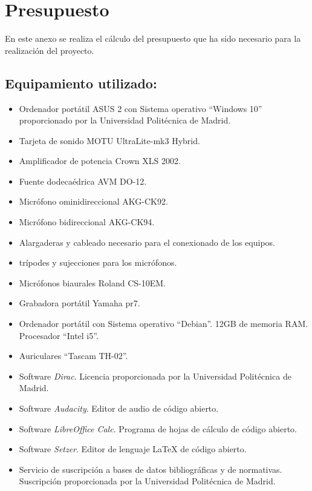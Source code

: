 \documentclass[11pt,a4paper,twoside]{book}
\author{Víctor de Tejada Molera}
\begin{document}
\appendix

\chapter{Presupuesto}
En este anexo se realiza el cálculo del presupuesto que ha sido necesario para la realización del proyecto.

    \section*{Equipamiento utilizado:}

    \begin{itemize}
        \item Ordenador portátil ASUS 2 con Sistema operativo ``Windows 10'' proporcionado por la Universidad Politécnica de Madrid.
	    \item Tarjeta de sonido MOTU UltraLite-mk3 Hybrid.
	    \item Amplificador de potencia Crown XLS 2002.
	    \item Fuente dodecaédrica AVM DO-12.
	    \item Micrófono ominidireccional AKG-CK92.
	    \item Micrófono bidireccional AKG-CK94.
	    \item Alargaderas y cableado necesario para el conexionado de los equipos.
	    \item trípodes y sujecciones para los micrófonos.
	    \item Micrófonos biaurales Roland CS-10EM.
	    \item Grabadora portátil Yamaha pr7.
        \item Ordenador portátil con Sistema operativo ``Debian''. 12GB de memoria RAM. Procesador ``Intel i5''.
	    \item Auriculares ``Tascam TH-02''. 
	    \item Software \textit{Dirac}. Licencia proporcionada por la Universidad Politécnica de Madrid.
	    \item Software \textit{Audacity}. Editor de audio de código abierto.
	    \item Software \textit{LibreOffice Calc}. Programa de hojas de cálculo de código abierto.
		\item Software \textit{Setzer}. Editor de lenguaje LaTeX de código abierto.
		\item Servicio de suscripción a bases de datos bibliográficas y de normativas. Suscripción proporcionada por la Universidad Politécnica de Madrid.
    \end{itemize}
\end{document}
